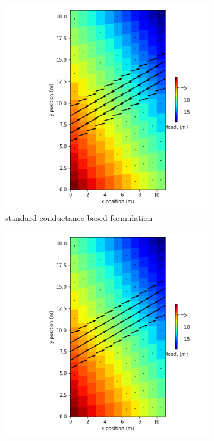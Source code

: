 \documentclass{article}
\begin{document}
\begin{figure}[H]
\centering
\begin{subfigure}{0.4\textwidth}
	\includegraphics[width=\textwidth]{../figures/disu-d-af-vs-s-head.png}
	\caption{standard conductance-based formulation}
	\label{fig:disu-s-cc-head}
\end{subfigure}
\hfill
\begin{subfigure}{0.4\textwidth}
	\includegraphics[width=\textwidth]{../figures/disu-d-af-vs-x-head.png}

\end{subfigure}
\end{figure}
\end{document}
